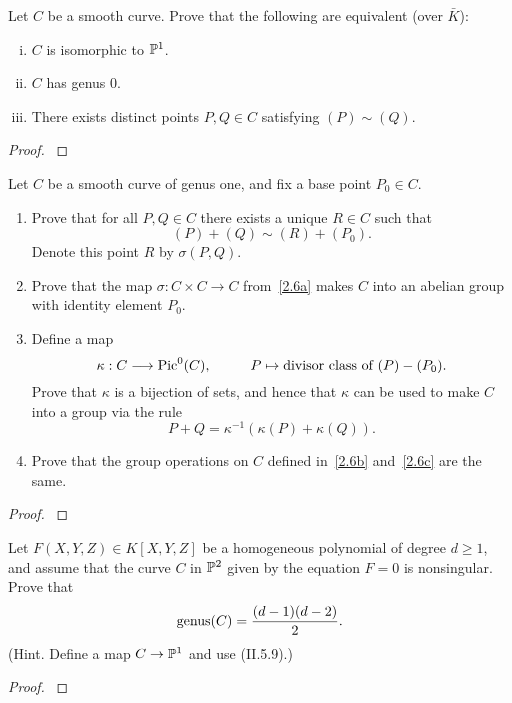 \documentclass[12pt,reqno]{amsart}
\begin{document}
\begin{exe}\label{2.5}
Let $C$ be a smooth curve.  Prove that the following are equivalent (over $\bar{K}$):
\begin{enumerate}[(i)]
\item
$C$ is isomorphic to ${\mathbb P}^1$.

\item
$C$ has genus $0$.

\item
There exists distinct points $P, Q \in C$ satisfying $(P)\sim (Q)$.
\end{enumerate}
\begin{proof}\label{s2.5}

\end{proof} 
\end{exe} 

\begin{exe}\label{2.6}
Let $C$ be a smooth curve of genus one, and fix a base point $P_0 \in C$.
\begin{enumerate}
\item\label{2.6a}
Prove that for all $P, Q \in C$ there exists a unique $R \in C$ such that
\[
(P)+(Q)\sim (R)+(P_0).
\]
Denote this point $R$ by $\sigma(P, Q)$.

\item\label{2.6b}
Prove that the map $\sigma : C \times C \to C$ from~\ref{2.6a} makes $C$ into an abelian group with identity element $P_0$.

\item\label{2.6c}
Define  a map 
\[
\kappa: C \longrightarrow {\operatorname{Pic}}^0(C),\;\;\;\;\;\;\;\;\;\; P \mapsto \mbox{divisor class of }(P)-(P_0).
\]
Prove that $\kappa$ is a bijection of sets, and hence that $\kappa$ can be used to make $C$ into a group via the rule
\[
P+Q=\kappa^{-1}\left(\kappa(P)+\kappa(Q)\right).
\]

\item\label{2.6d}
Prove that the group operations on $C$ defined in~\ref{2.6b} and~\ref{2.6c} are the same.
\end{enumerate}
\begin{proof}\label{s2.6}

\end{proof} 
\end{exe} 

\begin{exe}\label{2.7}
Let $F(X, Y, Z)\in K[X, Y, Z]$ be a homogeneous polynomial of degree $d \geq 1$, and assume that the curve $C$ in ${\mathbb P}^2$ given by the equation $F=0$ is nonsingular.  Prove that
\[
{\operatorname{genus}}(C)=\frac{(d-1)(d-2)}{2}.
\]
(Hint. Define a map $C\to {\mathbb P}^1$ and use (II.5.9).)
\begin{proof}\label{s2.7}

\end{proof} 
\end{exe} 
\end{document}
